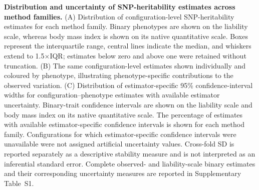 \caption{\textbf{Distribution and uncertainty of SNP-heritability estimates across method families.} (A) Distribution of configuration-level SNP-heritability estimates for each method family. Binary phenotypes are shown on the liability scale, whereas body mass index is shown on its native quantitative scale. Boxes represent the interquartile range, central lines indicate the median, and whiskers extend to 1.5$\times$IQR; estimates below zero and above one were retained without truncation. (B) The same configuration-level estimates shown individually and coloured by phenotype, illustrating phenotype-specific contributions to the observed variation. (C) Distribution of estimator-specific 95\% confidence-interval widths for configuration--phenotype estimates with available estimator uncertainty. Binary-trait confidence intervals are shown on the liability scale and body mass index on its native quantitative scale. The percentage of estimates with available estimator-specific confidence intervals is shown for each method family. Configurations for which estimator-specific confidence intervals were unavailable were not assigned artificial uncertainty values. Cross-fold SD is reported separately as a descriptive stability measure and is not interpreted as an inferential standard error. Complete observed- and liability-scale binary estimates and their corresponding uncertainty measures are reported in Supplementary Table~S1.}

